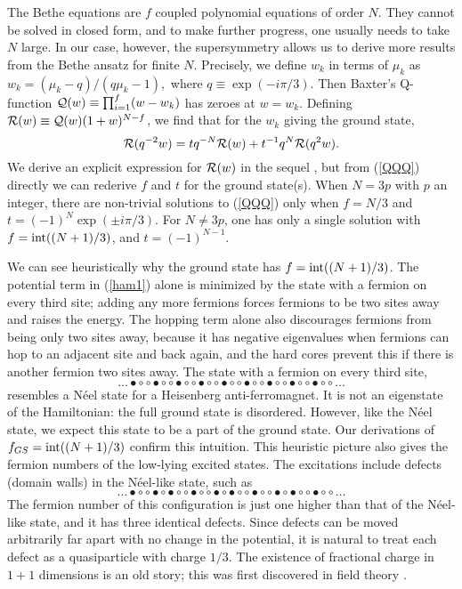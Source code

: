 \documentclass[a4paper,prl,aps,twocolumn]{revtex4}
\begin{document}
The Bethe equations are $f$ coupled polynomial equations of order $N$.  
They cannot be solved in closed form, and to make further progress,  
one usually needs to take $N$ large. In our case, however, the  
supersymmetry allows us to derive more results from the Bethe ansatz  
for finite $N$.  Precisely, we define $w_k$ in terms of $\mu_k$ as
$w_k = (\mu_k-q)/(q\mu_k-1),$  
where $q\equiv\exp(-i\pi/3)$. Then Baxter's Q-function 
\cite{Baxter} ${\cal Q}(w)\equiv\prod_{i=1}^f (w-w_k)$ has
zeroes at $w=w_k$. 
Defining ${\cal R}(w)\equiv {\cal Q}(w)(1+w)^{N-f}$, we find that   
for the $w_k$ giving the ground state,
\begin{equation}  
{\cal R}(q^{-2}w) = t q^{-N}{\cal R}(w) +   
t^{-1} q^N {\cal R}(q^2 w).  
\label{QQQ}  
\end{equation}
We derive an explicit expression for
${\cal R}(w)$ in the sequel \cite{FSii}, but from (\ref{QQQ}) directly
we can rederive $f$ and $t$ for the ground state(s).
When $N=3p$ with $p$ an integer,  
there are non-trivial solutions to (\ref{QQQ}) only when  
$f=N/3$ and $t=(-1)^N\exp(\pm i\pi/3)$. For $N\ne 3p$,   
one has only a single solution with $f=\hbox{int}((N+1)/3)$, and  
$t=(-1)^{N-1}$. 

We can see heuristically why the ground state has $f=\hbox{int}((N+1)/3)$.  
The potential term in (\ref{ham1}) alone is minimized by the state with  
a fermion on every third site; adding any more fermions forces  
fermions to be two sites away and raises the energy. The hopping term  
alone also discourages fermions from being only two sites away,
because it has negative eigenvalues when fermions can hop to an  
adjacent site and back again, and the hard cores prevent this if there  
is another fermion two sites away. The state with a fermion on every  
third site, 
$$\dots 
\bullet\circ\circ
\bullet\circ\circ
\bullet\circ\circ
\bullet\circ\circ
\bullet\circ\circ
\bullet\circ\circ
\bullet\circ\circ
\bullet\circ\circ
\bullet\circ\circ
\dots$$ resembles a N\'eel state for a Heisenberg anti-ferromagnet. 
It is not an eigenstate of the Hamiltonian: the
full ground state is disordered. However, like the N\'eel state, we
expect this state to be a part of the ground state. Our derivations
of $f_{GS}=\hbox{int}((N+1)/3)$ confirm this intuition.
This heuristic picture also gives the fermion numbers of the low-lying
excited states.  The excitations include defects (domain walls) in the
N\'eel-like state, such as
$$\dots 
\bullet\circ\circ
\bullet\circ
\bullet\circ\circ
\bullet\circ\circ
\bullet\circ
\bullet\circ\circ
\bullet\circ\circ
\bullet\circ
\bullet\circ\circ 
\bullet\circ\circ 
\dots$$ The fermion number of this
configuration is just one higher than that of the N\'eel-like state,
and it has three identical defects. Since defects can be moved
arbitrarily far apart with no change in the potential, it is
natural to treat each defect as a quasiparticle with charge $1/3$.
The existence of fractional charge in $1+1$ dimensions is an old
story; this was first discovered in field theory \cite{JRGW}.
\end{document}
